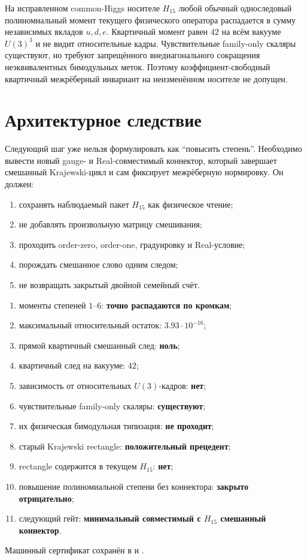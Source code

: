 \begin{theorem}
На исправленном common-Higgs носителе $H_{15}$ любой обычный
односледовый полиномиальный момент текущего физического оператора
распадается в сумму независимых вкладов $u,d,e$. Квартичный момент равен
$42$ на всём вакууме $U(3)^3$ и не видит относительные кадры.
Чувствительные family-only скаляры существуют, но требуют запрещённого
внедиагонального сокращения неэквивалентных бимодульных меток. Поэтому
коэффициент-свободный квартичный межрёберный инвариант на неизменённом
носителе не допущен.
\end{theorem}

\section{Архитектурное следствие}

Следующий шаг уже нельзя формулировать как ``повысить степень''. Необходимо
вывести новый gauge- и Real-совместимый коннектор, который завершает
смешанный Krajewski-цикл и сам фиксирует межрёберную нормировку. Он должен:
\begin{enumerate}
 \item сохранять наблюдаемый пакет $H_{15}$ как физическое чтение;
 \item не добавлять произвольную матрицу смешивания;
 \item проходить order-zero, order-one, градуировку и Real-условие;
 \item порождать смешанное слово одним следом;
 \item не возвращать закрытый двойной семейный счёт.
\end{enumerate}

\begin{protocol}
\begin{enumerate}
 \item моменты степеней $1$--$6$: \textbf{точно распадаются по кромкам};
 \item максимальный относительный остаток: \textbf{$3.93\cdot10^{-16}$};
 \item прямой квартичный смешанный след: \textbf{ноль};
 \item квартичный след на вакууме: \textbf{$42$};
 \item зависимость от относительных $U(3)$-кадров: \textbf{нет};
 \item чувствительные family-only скаляры: \textbf{существуют};
 \item их физическая бимодульная типизация: \textbf{не проходит};
 \item старый Krajewski rectangle: \textbf{положительный прецедент};
 \item rectangle содержится в текущем $H_{15}$: \textbf{нет};
 \item повышение полиномиальной степени без коннектора:
 \textbf{закрыто отрицательно};
 \item следующий гейт: \textbf{минимальный совместимый с $H_{15}$
 смешанный коннектор}.
\end{enumerate}
\end{protocol}

Машинный сертификат сохранён в
 и
.